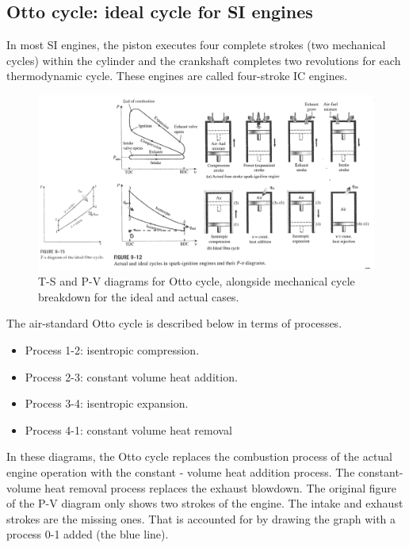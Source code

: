 \documentclass[class=report, crop=false, 12pt,a4paper]{standalone}
\begin{document}
\subsection{Otto cycle: ideal cycle for SI engines}
In most SI engines, the piston executes four complete strokes (two mechanical cycles) within the cylinder and the crankshaft completes two revolutions for each thermodynamic cycle. These engines are called four-stroke IC engines.
\begin{figure}
  \centering
  \includegraphics[width = \textwidth]{../img/OttoCycleDiagram}
  \caption{T-S and P-V diagrams for Otto cycle, alongside mechanical cycle breakdown for the ideal and actual cases.} 
\end{figure}
The air-standard Otto cycle is described below in terms of processes.
\begin{itemize}[noitemsep]
  \item Process 1-2: isentropic compression.
  \item Process 2-3: constant volume heat addition.
  \item Process 3-4: isentropic expansion.
  \item Process 4-1: constant volume heat removal
\end{itemize}
In these diagrams, the Otto cycle replaces the combustion process of the actual engine operation with the constant - volume heat addition process. The constant-volume heat removal process replaces the exhaust blowdown. The original figure of the P-V diagram only shows two strokes of the engine. The intake and exhaust strokes are the missing ones. That is accounted for by drawing the graph with a process 0-1 added (the blue line).
\end{document}
